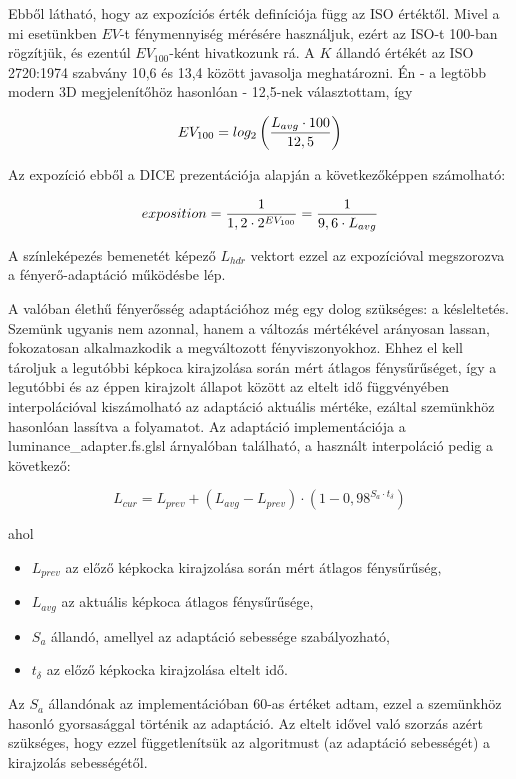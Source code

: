 Ebből látható, hogy az expozíciós érték definíciója függ az ISO értéktől. Mivel a mi esetünkben \(EV\)-t fénymennyiség mérésére használjuk, ezért az ISO-t 100-ban rögzítjük, és ezentúl \(EV_{100}\)-ként hivatkozunk rá. A \(K\) állandó értékét az ISO 2720:1974 szabvány 10,6 és 13,4 között javasolja meghatározni. Én - a legtöbb modern 3D megjelenítőhöz hasonlóan - 12,5-nek választottam, így

\[
EV_{100} = log_2\left({ L_{avg} \cdot 100 } \over 12,5\right)
\]

Az expozíció ebből a DICE prezentációja alapján a következőképpen számolható:

\[
exposition = { 1 \over { 1,2 \cdot 2^{EV_{100}} } } = { 1 \over { 9,6 \cdot L_{avg} } }
\]

A színleképezés bemenetét képező \(L_{hdr}\) vektort ezzel az expozícióval megszorozva a fényerő-adaptáció működésbe lép.

A valóban élethű fényerősség adaptációhoz még egy dolog szükséges: a késleltetés. Szemünk ugyanis nem azonnal, hanem a változás mértékével arányosan lassan, fokozatosan alkalmazkodik a megváltozott fényviszonyokhoz. Ehhez el kell tároljuk a legutóbbi képkoca kirajzolása során mért átlagos fénysűrűséget, így a legutóbbi és az éppen kirajzolt állapot között az eltelt idő függvényében interpolációval kiszámolható az adaptáció aktuális mértéke, ezáltal szemünkhöz hasonlóan lassítva a folyamatot. Az adaptáció implementációja a luminance\_adapter.fs.glsl árnyalóban található, a használt interpoláció pedig a következő:

\[
L_{cur} = L_{prev} + (L_{avg} - L_{prev}) \cdot (1 - 0,98^{S_a \cdot t_{\delta}})
\]

ahol

\begin{itemize}[noitemsep]
\item \(L_{prev}\) az előző képkocka kirajzolása során mért átlagos fénysűrűség,
\item \(L_{avg}\) az aktuális képkoca átlagos fénysűrűsége,
\item \(S_a\) állandó, amellyel az adaptáció sebessége szabályozható,
\item \(t_{\delta}\) az előző képkocka kirajzolása eltelt idő.
\end{itemize}

Az \(S_a\) állandónak az implementációban 60-as értéket adtam, ezzel a szemünkhöz hasonló gyorsasággal történik az adaptáció. Az eltelt idővel való szorzás azért szükséges, hogy ezzel függetlenítsük az algoritmust (az adaptáció sebességét) a kirajzolás sebességétől.

